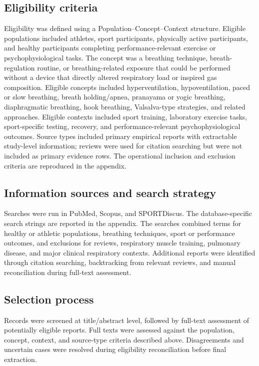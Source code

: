 \documentclass[12pt,a4paper]{article}
\begin{document}
\subsection{Eligibility criteria}
Eligibility was defined using a Population--Concept--Context structure. Eligible populations included athletes, sport participants, physically active participants, and healthy participants completing performance-relevant exercise or psychophysiological tasks. The concept was a breathing technique, breath-regulation routine, or breathing-related exposure that could be performed without a device that directly altered respiratory load or inspired gas composition. Eligible concepts included hyperventilation, hypoventilation, paced or slow breathing, breath holding/apnea, pranayama or yogic breathing, diaphragmatic breathing, hook breathing, Valsalva-type strategies, and related approaches. Eligible contexts included sport training, laboratory exercise tasks, sport-specific testing, recovery, and performance-relevant psychophysiological outcomes. Source types included primary empirical reports with extractable study-level information; reviews were used for citation searching but were not included as primary evidence rows. The operational inclusion and exclusion criteria are reproduced in the appendix.

\subsection{Information sources and search strategy}
Searches were run in PubMed, Scopus, and SPORTDiscus. The database-specific search strings are reported in the appendix. The searches combined terms for healthy or athletic populations, breathing techniques, sport or performance outcomes, and exclusions for reviews, respiratory muscle training, pulmonary disease, and major clinical respiratory contexts. Additional reports were identified through citation searching, backtracking from relevant reviews, and manual reconciliation during full-text assessment.

\subsection{Selection process}
Records were screened at title/abstract level, followed by full-text assessment of potentially eligible reports. Full texts were assessed against the population, concept, context, and source-type criteria described above. Disagreements and uncertain cases were resolved during eligibility reconciliation before final extraction.
\end{document}
